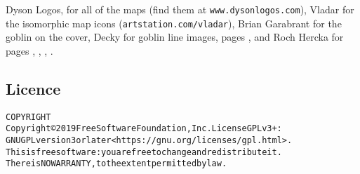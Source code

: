 \begin{multicols}{2}
Dyson Logos, for all of the maps (find them at {\tt www.dysonlogos.com}),
\iftoggle{hardcore}{%
Daniel F. Walthall for the flat dungeon icon images in the Seeker's tower,
}{}%
Vladar for the isomorphic map icons ({\tt artstation.com/vladar}),
Brian Garabrant for the goblin on the cover,
Decky for goblin line images, pages \pageref{Decky/armoury},
\iftoggle{oneshot}{and \pageref{Decky/screech};}{}
and Roch Hercka for pages \pageref{Roch_Hercka/transformation}, \pageref{Roch_Hercka/waking}, \pageref{Roch_Hercka/dragon}, \pageref{Roch_Hercka/garden}\iftoggle{oneshot}{}{, and \pageref{Roch_Hercka/spiral_staircase}}.

\columnbreak

\end{multicols}

\subsection*{Licence}

\begin{alltt}
COPYRIGHT
       Copyright \copyright 2019 Free Software Foundation, Inc.  License GPLv3+:
  GNU GPL version 3 or later <https://gnu.org/licenses/gpl.html>.
       This is free software: you are free to change and redistribute it.
  There is NO WARRANTY, to the extent permitted by law.

\end{alltt}

\pagebreak

\printglossary[
  style=topicmcols,
  nonumberlist,
  ]


\printglossary[
  type=mech,
  style=topicmcols,
  ]
\label{rulesEnd}
